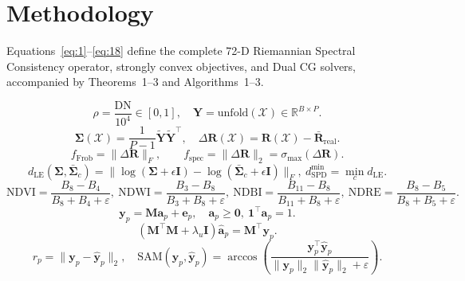 \documentclass[journal]{IEEEtran}
\begin{document}
\section{Methodology}
Equations~\eqref{eq:1}--\eqref{eq:18} define the complete 72-D Riemannian Spectral Consistency operator, strongly convex objectives, and Dual CG solvers, accompanied by Theorems~1--3 and Algorithms~1--3.

\begin{equation}\rho = \frac{\mathrm{DN}}{10^4} \in [0,1],\quad \mathbf{Y}=\mathrm{unfold}(\mathcal{X})\in\mathbb{R}^{B\times P}.\label{eq:1}\end{equation}
\begin{equation}\mathbf{\Sigma}(\mathcal{X})=\frac{1}{P-1}\tilde{\mathbf{Y}}\tilde{\mathbf{Y}}^\top,\quad \Delta\mathbf{R}(\mathcal{X})=\mathbf{R}(\mathcal{X})-\bar{\mathbf{R}}_{\mathrm{real}}.\label{eq:2}\end{equation}
\begin{equation}f_{\mathrm{Frob}}=\|\Delta\mathbf{R}\|_F,\qquad f_{\mathrm{spec}}=\|\Delta\mathbf{R}\|_2=\sigma_{\max}(\Delta\mathbf{R}).\label{eq:3}\end{equation}
\begin{equation}d_{\mathrm{LE}}(\mathbf{\Sigma},\bar{\mathbf{\Sigma}}_c)=\|\log(\mathbf{\Sigma}+\epsilon\mathbf{I})-\log(\bar{\mathbf{\Sigma}}_c+\epsilon\mathbf{I})\|_F,\ d_{\mathrm{SPD}}^{\min}=\min_c d_{\mathrm{LE}}.\label{eq:4}\end{equation}
\begin{equation}\mathrm{NDVI}=\frac{B_8-B_4}{B_8+B_4+\varepsilon},\ \mathrm{NDWI}=\frac{B_3-B_8}{B_3+B_8+\varepsilon},\ \mathrm{NDBI}=\frac{B_{11}-B_8}{B_{11}+B_8+\varepsilon},\ \mathrm{NDRE}=\frac{B_8-B_5}{B_8+B_5+\varepsilon}.\label{eq:5}\end{equation}
\begin{equation}\mathbf{y}_p=\mathbf{M}\mathbf{a}_p+\mathbf{e}_p,\quad \mathbf{a}_p\ge\mathbf{0},\ \mathbf{1}^\top\mathbf{a}_p=1.\label{eq:6}\end{equation}
\begin{equation}(\mathbf{M}^\top\mathbf{M}+\lambda_u\mathbf{I})\hat{\mathbf{a}}_p=\mathbf{M}^\top\mathbf{y}_p.\label{eq:7}\end{equation}
\begin{equation}r_p=\|\mathbf{y}_p-\hat{\mathbf{y}}_p\|_2,\quad \mathrm{SAM}(\mathbf{y}_p,\hat{\mathbf{y}}_p)=\arccos\!\left(\frac{\mathbf{y}_p^\top\hat{\mathbf{y}}_p}{\|\mathbf{y}_p\|_2\|\hat{\mathbf{y}}_p\|_2+\varepsilon}\right).\label{eq:8}\end{equation}
\end{document}

